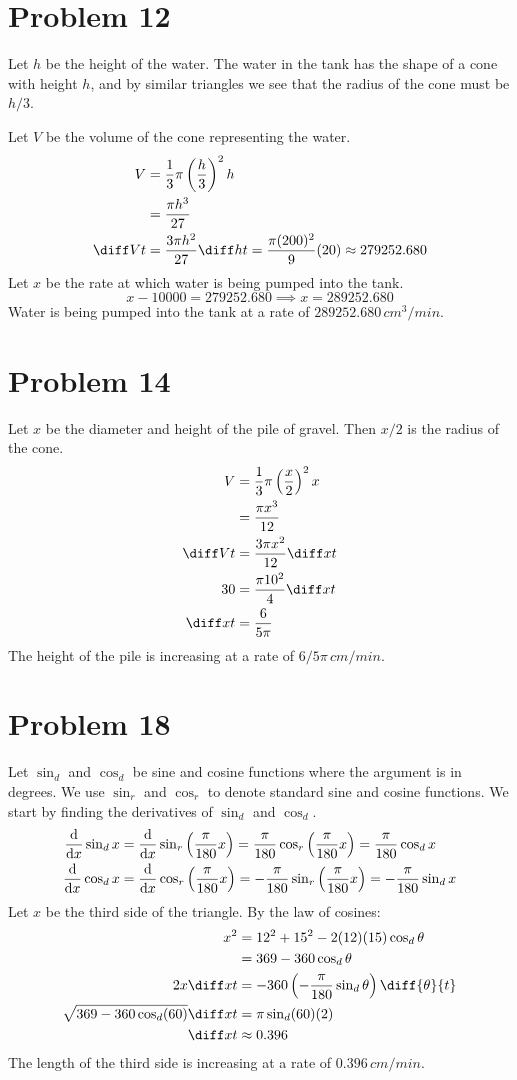 \documentclass[preview, margin=0.6in]{standalone}
\newcommand*{\paren}[1]{\ensuremath\left(#1\right)}
\newcommand*{\problem}[1]{\section*{Problem #1}}
\newcommand*{\deriv}[1][x]{\ensuremath{\dfrac{\mathrm{d}}{\mathrm{d}#1}}}
\begin{document}
\problem{12}
Let $h$ be the height of the water. The water in the tank has the shape of a cone with height $h$, and by similar triangles we see that the radius of the cone must be $h/3$.

Let $V$ be the volume of the cone representing the water.
\begin{align*}
	V&=\frac13\pi\paren{\frac h3}^2h \\
	&=\frac{\pi h^3}{27} \\
	\diff Vt&=\frac{3\pi h^2}{27}\diff ht
	=\frac{\pi(200)^2}{9}(20)
	\approx 279252.680
\end{align*}
Let $x$ be the rate at which water is being pumped into the tank.
\begin{equation*}
	x-10000=279252.680 \implies x=289252.680
\end{equation*}
Water is being pumped into the tank at a rate of $289252.680\,cm^3/min$.

\problem{14}
Let $x$ be the diameter and height of the pile of gravel. Then $x/2$ is the radius of the cone.
\begin{align*}
	V&=\frac13\pi\paren{\frac x2}^2x \\
	&=\frac{\pi x^3}{12} \\
	\diff Vt&=\frac{3\pi x^2}{12}\diff xt \\
	30&=\frac{\pi 10^2}{4}\diff xt \\
	\diff xt&=\frac{6}{5\pi}
\end{align*}
The height of the pile is increasing at a rate of $6/5\pi\,cm/min$.

\problem{18}
Let $\sin_d$ and $\cos_d$ be sine and cosine functions where the argument is in degrees. We use $\sin_r$ and $\cos_r$ to denote standard sine and cosine functions. We start by finding the derivatives of $\sin_d$ and $\cos_d$.
\begin{align*}
	\deriv\sin_d x
	&=\deriv\sin_r\paren{\frac{\pi}{180}x}
	=\frac{\pi}{180}\cos_r\paren{\frac{\pi}{180}x}
	=\frac{\pi}{180}\cos_d x \\
	\deriv\cos_d x
	&=\deriv\cos_r\paren{\frac{\pi}{180}x}
	=-\frac{\pi}{180}\sin_r\paren{\frac{\pi}{180}x}
	=-\frac{\pi}{180}\sin_d x
\end{align*}
Let $x$ be the third side of the triangle. By the law of cosines:
\begin{align*}
	x^2&=12^2+15^2-2(12)(15)\cos_d\theta \\
	&=369-360\cos_d\theta \\
	2x\diff xt&=-360\paren{-\frac{\pi}{180}\sin_d\theta}\diff{\theta}{t} \\
	\sqrt{369-360\cos_d(60)}\diff xt&=\pi\sin_d(60)(2) \\
	\diff xt&\approx0.396
\end{align*}
The length of the third side is increasing at a rate of $0.396\,cm/min$.
\end{document}
